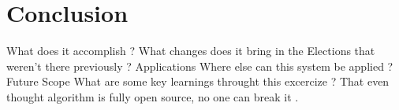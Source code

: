 \documentclass[12pt]{report}
\begin{document}
\chapter{Conclusion}
What does it accomplish ?
What changes does it bring in the Elections that weren't there previously ?
Applications 
Where else can this system be applied ?
Future Scope 
What are some key learnings throught this excercize ? 
That even thought algorithm is fully open source, no one can break it .

\begin{thebibliography}{9}
\end{thebibliography}
\end{document}
